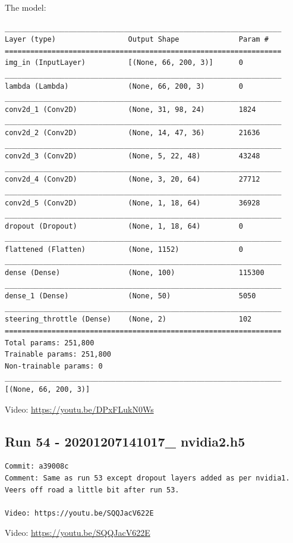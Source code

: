 The model:
\begin{verbatim}
_________________________________________________________________
Layer (type)                 Output Shape              Param #   
=================================================================
img_in (InputLayer)          [(None, 66, 200, 3)]      0         
_________________________________________________________________
lambda (Lambda)              (None, 66, 200, 3)        0         
_________________________________________________________________
conv2d_1 (Conv2D)            (None, 31, 98, 24)        1824      
_________________________________________________________________
conv2d_2 (Conv2D)            (None, 14, 47, 36)        21636     
_________________________________________________________________
conv2d_3 (Conv2D)            (None, 5, 22, 48)         43248     
_________________________________________________________________
conv2d_4 (Conv2D)            (None, 3, 20, 64)         27712     
_________________________________________________________________
conv2d_5 (Conv2D)            (None, 1, 18, 64)         36928     
_________________________________________________________________
dropout (Dropout)            (None, 1, 18, 64)         0         
_________________________________________________________________
flattened (Flatten)          (None, 1152)              0         
_________________________________________________________________
dense (Dense)                (None, 100)               115300    
_________________________________________________________________
dense_1 (Dense)              (None, 50)                5050      
_________________________________________________________________
steering_throttle (Dense)    (None, 2)                 102       
=================================================================
Total params: 251,800
Trainable params: 251,800
Non-trainable params: 0
_________________________________________________________________
[(None, 66, 200, 3)]    
\end{verbatim}

Video: \url{https://youtu.be/DPxFLukN0Ws}

\subsection{Run 54 - 20201207141017\_ nvidia2.h5}
\begin{verbatim}
Commit: a39008c
Comment: Same as run 53 except dropout layers added as per nvidia1.
Veers off road a little bit after run 53.

Video: https://youtu.be/SQQJacV622E
\end{verbatim}
Video: \url{https://youtu.be/SQQJacV622E}

